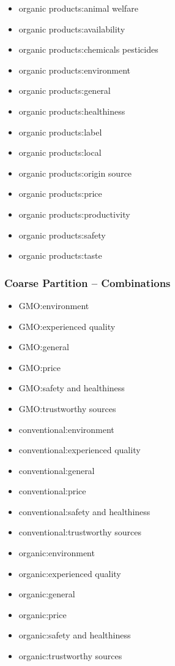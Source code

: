 \begin{multicols}{2}
\begin{itemize}[leftmargin=*]
		\item[] organic products:animal welfare
		\item[] organic products:availability 
		\item[] organic products:chemicals pesticides 
		\item[] organic products:environment
		\item[] organic products:general
		\item[] organic products:healthiness
		\item[] organic products:label 
		\item[] organic products:local 
		\item[] organic products:origin source 
		\item[] organic products:price 
		\item[] organic products:productivity 
		\item[] organic products:safety
		\item[] organic products:taste 
		\label{li:08_og_aspects} 
	\end{itemize}
\end{multicols}

\subsubsection*{Coarse Partition -- Combinations}

\begin{multicols}{2}
	\begin{itemize}[leftmargin=*]
		\setlength\itemsep{-0.5em}
		\item[] GMO:environment 
		\item[] GMO:experienced quality 
		\item[] GMO:general 
		\item[] GMO:price
		\item[] GMO:safety and healthiness
		\item[] GMO:trustworthy sources 
		\item[] conventional:environment 
		\item[] conventional:experienced quality 
		\item[] conventional:general 
		\item[] conventional:price
		\item[] conventional:safety and healthiness 
		\item[] conventional:trustworthy sources 
		\item[] organic:environment 
		\item[] organic:experienced quality 
		\item[] organic:general 
		\item[] organic:price
		\item[] organic:safety and healthiness
		\item[] organic:trustworthy sources
		\label{li:08_og_aspectsCoarse}  
	\end{itemize}
\end{multicols}

